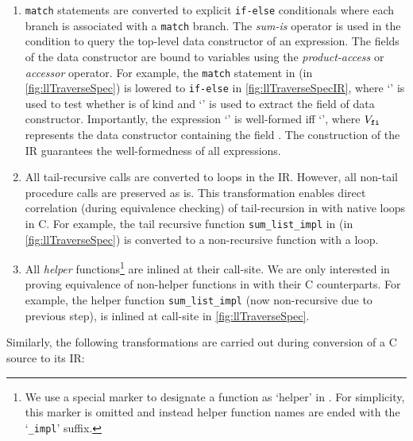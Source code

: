 \begin{enumerate}
\item {\tt match} statements are converted to explicit {\tt if-else} conditionals where each branch is
associated with a {\tt match} branch. The {\em sum-is} operator is used in the condition to query
the top-level data constructor of an expression. The fields of the data constructor are bound to
variables using the {\em product-access} or {\em accessor} operator.
For example, the {\tt match} statement in  (in \cref{fig:llTraverseSpec}) is lowered to {\tt if-else}
in \cref{fig:llTraverseSpecIR}, where `' is used to test whether  is
of kind  and `' is used to extract the  field of  data constructor.
Importantly, the expression `' is well-formed iff `', where $V_{{\tt fi}}$ represents the
data constructor containing the field .
The construction of the IR guarantees the well-formedness of all expressions.
\item All tail-recursive calls are converted to loops in the IR. However, all non-tail procedure calls are preserved as is.
This transformation enables direct correlation (during equivalence checking) of tail-recursion in \SpecL{} with native loops in C.
For example, the tail recursive function {\tt sum\_list\_impl} in  (in \cref{fig:llTraverseSpec}) is converted to a non-recursive function with a loop.
\item All {\em helper} functions\footnote{We use a special marker to designate a function as `helper' in \SpecL{}.
For simplicity, this marker is omitted and instead helper function names are ended with the `{\tt \_impl}' suffix.}
are inlined at their call-site.
We are only interested in proving equivalence of non-helper functions in \SpecL{} with their C counterparts.
For example, the helper function {\tt sum\_list\_impl} (now non-recursive due to previous step), is inlined
at call-site  in \cref{fig:llTraverseSpec}.
\end{enumerate}

Similarly, the following transformations are carried out during conversion of a C source to its IR:

